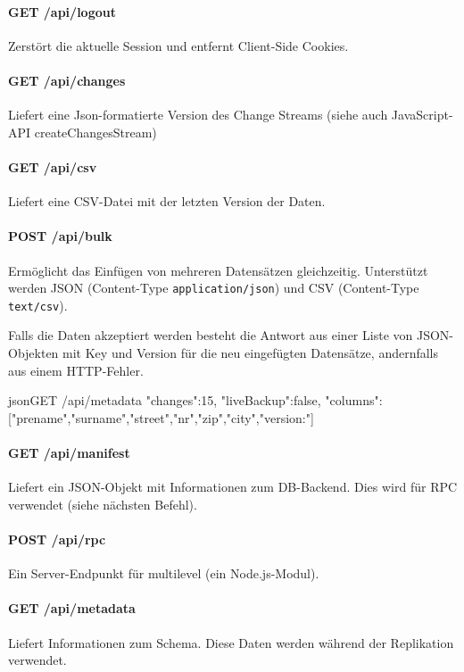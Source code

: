 \paragraph{GET /api/logout}
Zerstört die aktuelle Session und entfernt Client-Side Cookies.

\paragraph{GET /api/changes}
Liefert eine Json-formatierte Version des Change Streams (siehe auch JavaScript-API createChangesStream) 

\paragraph{GET /api/csv}
Liefert eine CSV-Datei mit der letzten Version der Daten.

\paragraph{POST /api/bulk}
Ermöglicht das Einfügen von mehreren Datensätzen gleichzeitig. Unterstützt werden JSON (Content-Type \texttt{application/json}) und CSV (Content-Type \texttt{text/csv}).

Falls die Daten akzeptiert werden besteht die Antwort aus einer Liste von JSON-Objekten mit Key und Version für die neu eingefügten Datensätze, andernfalls aus einem HTTP-Fehler.

\begin{srclst}{json}{GET /api/metadata}
{
    "changes":15, 
    "liveBackup":false, 
    "columns":["prename","surname","street","nr","zip","city","version:"]
}
\end{srclst}

\paragraph{GET /api/manifest}
Liefert ein JSON-Objekt mit Informationen zum DB-Backend. Dies wird für RPC verwendet (siehe nächsten Befehl).

\paragraph{POST /api/rpc}
Ein Server-Endpunkt für multilevel (ein Node.js-Modul).

\paragraph{GET /api/metadata}
Liefert Informationen zum Schema. Diese Daten werden während der Replikation verwendet.

